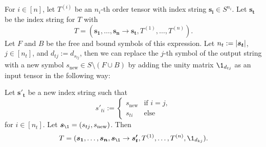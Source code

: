 \begin{lemma}
    \label{lemma:nested_einsum:2}
    For $i \in [n]$, let $T^{(i)}$ be an $n_i$-th order tensor with index string $\bm{s_i} \in S^{n_i}$.
    Let $\bm{s_t}$ be the index string for $T$ with
    $$T = (\bm{s_1}, \dots, \bm{s_n} \rightarrow \bm{s_t}, T^{(1)}, \dots, T^{(n)}).$$
    Let $F$ and $B$ be the free and bound symbols of this expression.
    Let $n_t := \left\lvert \bm{s_t} \right\rvert$, $j \in [n_t]$, and $d_{tj} := d_{s_{tj}}$, then we can replace the $j$-th symbol of the output string with a new symbol $s_{\text{new}} \in S \setminus (F \cup B)$ by adding the unity matrix $\1_{d_{tj}}$ as an input tensor in the following way:

    Let $\bm{s'_t}$ be a new index string such that
    $$s'_{ti} := \begin{cases}
            s_{\text{new}} & \text{if $i = j$}, \\
            s_{ti}         & \text{else}
        \end{cases}$$
    for $i \in [n_t]$.
    Let $\bm{s_\1} = (s_{tj}, s_{\text{new}})$.
    Then
    $$T = (\bm{s_1}, \dots, \bm{s_n}, \bm{s_\1} \rightarrow \bm{s'_t}, T^{(1)}, \dots, T^{(n)}, \1_{d_{kj}}).$$
\end{lemma}

